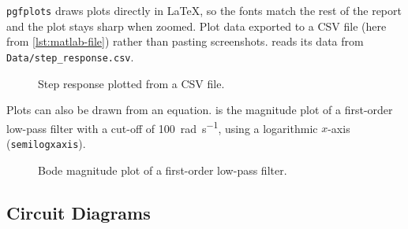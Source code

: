 \texttt{pgfplots} draws plots directly in LaTeX, so the fonts match the
rest of the report and the plot stays sharp when zoomed. Plot data
exported to a CSV file (here from \cref{lst:matlab-file}) rather than
pasting screenshots.  reads its data from
\texttt{Data/step\_response.csv}.

\begin{figure}[H]
    \centering
    \caption{Step response plotted from a CSV file.}
    \label{fig:step}
\end{figure}

Plots can also be drawn from an equation.  is the magnitude
plot of a first-order low-pass filter with a cut-off of
\qty{100}{\radian\per\second}, using a logarithmic $x$-axis
(\verb|semilogxaxis|).

\begin{figure}[H]
    \centering
    \caption{Bode magnitude plot of a first-order low-pass filter.}
    \label{fig:bode}
\end{figure}

\subsection{Circuit Diagrams}
\label{sec:circuit-diagrams}

